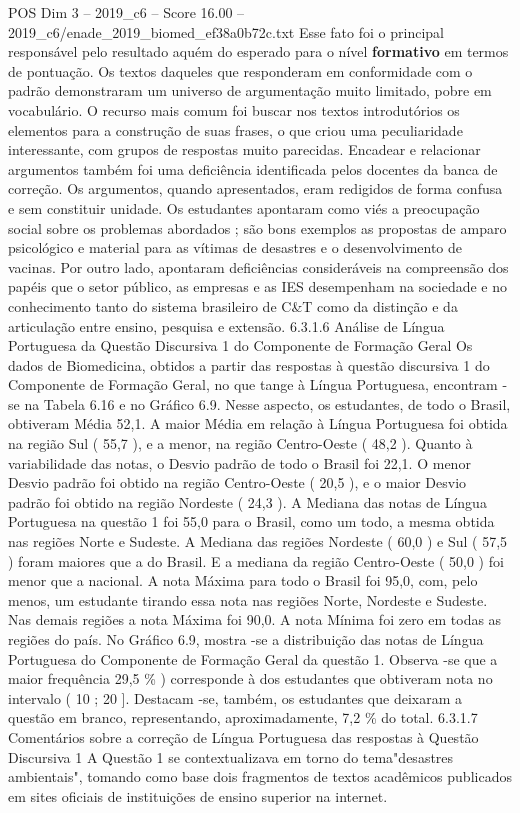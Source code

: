 \begin{textsample}{POS Dim 3 – 2019\_c6 – Score 16.00 – 2019\_c6/enade\_2019\_biomed\_ef38a0b72c.txt}
Esse fato foi o principal responsável pelo resultado aquém do esperado para o nível \textbf{formativo} em termos de pontuação.
Os textos daqueles que responderam em conformidade com o padrão demonstraram um universo de argumentação muito limitado, pobre em vocabulário.
O recurso mais comum foi buscar nos textos introdutórios os elementos para a construção de suas frases, o que criou uma peculiaridade interessante, com grupos de respostas muito parecidas.
Encadear e relacionar argumentos também foi uma deficiência identificada pelos docentes da banca de correção.
Os argumentos, quando apresentados, eram redigidos de forma confusa e sem constituir unidade.
Os estudantes apontaram como viés a preocupação social sobre os problemas abordados ; são bons exemplos as propostas de amparo psicológico e material para as vítimas de desastres e o desenvolvimento de vacinas.
Por outro lado, apontaram deficiências consideráveis na compreensão dos papéis que o setor público, as empresas e as IES desempenham na sociedade e no conhecimento tanto do sistema brasileiro de C\&T como da distinção e da articulação entre ensino, pesquisa e extensão. 6.3.1.6 Análise de Língua Portuguesa da Questão Discursiva 1 do Componente de Formação Geral Os dados de Biomedicina, obtidos a partir das respostas à questão discursiva 1 do Componente de Formação Geral, no que tange à Língua Portuguesa, encontram -se na Tabela 6.16 e no Gráfico 6.9.
Nesse aspecto, os estudantes, de todo o Brasil, obtiveram Média 52,1.
A maior Média em relação à Língua Portuguesa foi obtida na região Sul ( 55,7 ), e a menor, na região Centro-Oeste ( 48,2 ).
Quanto à variabilidade das notas, o Desvio padrão de todo o Brasil foi 22,1.
O menor Desvio padrão foi obtido na região Centro-Oeste ( 20,5 ), e o maior Desvio padrão foi obtido na região Nordeste ( 24,3 ).
A Mediana das notas de Língua Portuguesa na questão 1 foi 55,0 para o Brasil, como um todo, a mesma obtida nas regiões Norte e Sudeste.
A Mediana das regiões Nordeste ( 60,0 ) e Sul ( 57,5 ) foram maiores que a do Brasil.
E a mediana da região Centro-Oeste ( 50,0 ) foi menor que a nacional.
A nota Máxima para todo o Brasil foi 95,0, com, pelo menos, um estudante tirando essa nota nas regiões Norte, Nordeste e Sudeste.
Nas demais regiões a nota Máxima foi 90,0.
A nota Mínima foi zero em todas as regiões do país.
No Gráfico 6.9, mostra -se a distribuição das notas de Língua Portuguesa do Componente de Formação Geral da questão 1.
Observa -se que a maior frequência 29,5 \% ) corresponde à dos estudantes que obtiveram nota no intervalo ( 10 ; 20 ].
Destacam -se, também, os estudantes que deixaram a questão em branco, representando, aproximadamente, 7,2 \% do total. 6.3.1.7 Comentários sobre a correção de Língua Portuguesa das respostas à Questão Discursiva 1 A Questão 1 se contextualizava em torno do tema"desastres ambientais", tomando como base dois fragmentos de textos acadêmicos publicados em sites oficiais de instituições de ensino superior na internet.

\end{textsample}
